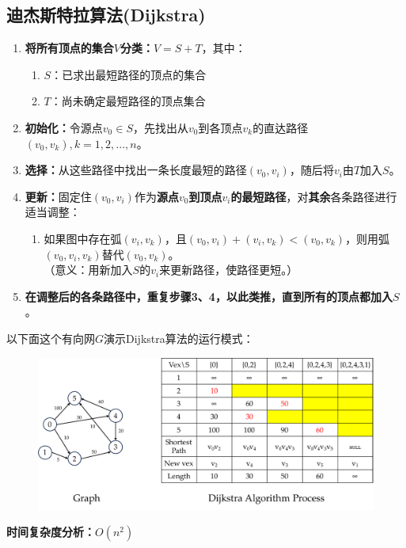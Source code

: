 \documentclass[11pt,a4paper]{article}
\begin{document}
\subsection{迪杰斯特拉算法(Dijkstra)}
\begin{enumerate}
	\item \textbf{将所有顶点的集合$V$分类：}$V=S+T$，其中：
	\begin{enumerate}
		\item $S$：已求出最短路径的顶点的集合
		\item $T$：尚未确定最短路径的顶点集合
	\end{enumerate}
	\item \textbf{初始化：}令源点$v_0\in S$，先找出从$v_0$到各顶点$v_k$的直达路径$(v_0,v_k),k=1,2,...,n$。
	\item \textbf{选择：}从这些路径中找出一条长度最短的路径$(v_0,v_i)$，随后将$v_i$由$T$加入$S$。
	\item \textbf{更新：}固定住$(v_0,v_i)$作为\textbf{源点$v_0$到顶点$v_i$的最短路径}，对\textbf{其余}各条路径进行适当调整：
	\begin{enumerate}
		\item 如果图中存在弧$(v_i,v_k)$，且$(v_0,v_i)+(v_i,v_k)<(v_0,v_k)$，则用弧$(v_0,v_i,v_k)$替代$(v_0,v_k)$。\\
		（意义：用新加入$S$的$v_i$来更新路径，使路径更短。）
	\end{enumerate}
	\item \textbf{在调整后的各条路径中，重复步骤3、4，以此类推，直到所有的顶点都加入$S$}。
\end{enumerate}
以下面这个有向网$G$演示Dijkstra算法的运行模式：
\begin{center}
	\begin{figure}[h]
		\centering
		\includegraphics[scale=0.53]{Dijkstra.pdf}
	\end{figure}
\end{center}
{\kaishu \textbf{时间复杂度分析：}}$O(n^2)$\\
\end{document}
